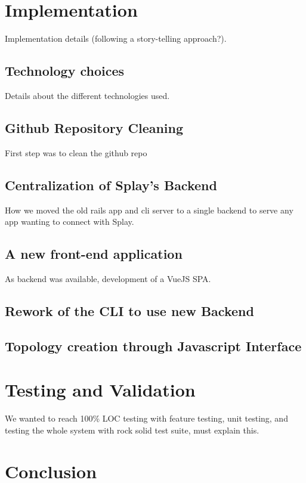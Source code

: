 \documentclass{eplmastersthesis}
\begin{document}
  \chapter{Implementation}

    Implementation details  (following a story-telling approach?).

    \section{Technology choices}

      Details about the different technologies used.

    \section{Github Repository Cleaning}

      First step was to clean the github repo

    \section{Centralization of Splay's Backend}

      How we moved the old rails app and cli server to a single backend
      to serve any app wanting to connect with Splay.

    \section{A new front-end application}

      As backend was available, development of a VueJS SPA.

    \section{Rework of the CLI to use new Backend}

    \section{Topology creation through Javascript Interface}


  \chapter{Testing and Validation}

    We wanted to reach 100\% LOC testing with feature testing, unit testing,
    and testing the whole system with rock solid test suite, must explain this.



  \chapter{Conclusion}




  \backcoverpage
\end{document}
